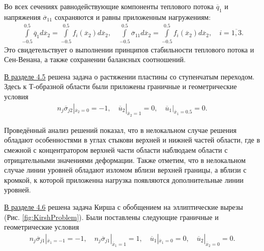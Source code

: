 Во всех сечениях равнодействующие компоненты теплового потока $\overline{q}_1$ и напряжения $\overline{\sigma}_{11}$ сохраняются и равны приложенным нагружениям:
\begin{gather*}
	\int\limits_{-0.5}^{0.5} \overline{q}_1 d\overline{x}_2 = 
	\int\limits_{-0.5}^{0.5} f_i (\overline{x}_2) d\overline{x}_2,
	\quad
	\int\limits_{-0.5}^{0.5} \overline{\sigma}_{11} d\overline{x}_2 = 
	\int\limits_{-0.5}^{0.5} f_i (\overline{x}_2) d\overline{x}_2,
	\quad	
	i = \overline{1,3}.
\end{gather*}
Это свидетельствует о выполнении принципов стабильности теплового потока и Сен-Венана, а также сохранении балансных соотношений.

\underline{В разделе 4.5} решена задача о растяжении пластины со ступенчатым переходом. Здесь к Т-образной области были приложены граничные и геометрические условия
\begin{gather*}
	n_j \overline{\sigma}_{j2} |_{\overline{x}_2 = 0} = -1,
	\quad
	\overline{u}_2 |_{\overline{x}_2 = 1} = 0,
	\quad
	\overline{u}_1 |_{\overline{x}_1 = 0.5} = 0.
\end{gather*}


Проведённый анализ решений показал, что в нелокальном случае решения обладают особенностями в углах стыкови верхней и нижней частей области, где в смежной с концентратором верхней части области наблюдаем области с отрицательными значениями деформации. Также отметим, что в нелокальном случае линии уровней обладают изломом вблизи верхней границы, а вблизи с кромкой, к которой приложенна нагрузка появляются дополнительные линии уровней.

\underline{В разделе 4.6} решена задача Кирша с обобщением на эллиптические вырезы (Рис. \ref{fig:KirshProblem}). Были поставлены следующие граничные и геометрические условия
\begin{gather*}
	n_j \overline{\sigma}_{j1} |_{\overline{x}_1 = -1} = -1,
	\quad
	n_j \overline{\sigma}_{j1} |_{\overline{x}_1 = 1} = 1,
	\quad
	\overline{u}_1 |_{\overline{x}_1 = 0} = 0,
	\quad
	\overline{u}_2 |_{\overline{x}_2 = 0} = 0.
\end{gather*}

